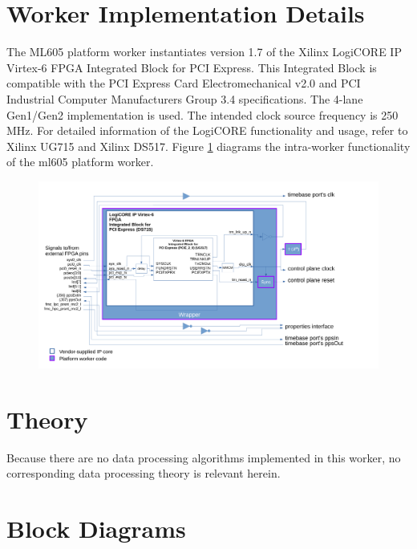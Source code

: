 \documentclass{article}
\begin{document}
\section*{Worker Implementation Details}
\begin{flushleft}
	The ML605 platform worker instantiates version 1.7 of the Xilinx LogiCORE IP Virtex-6 FPGA Integrated Block for PCI Express. This Integrated Block is compatible with the PCI Express Card Electromechanical v2.0 and PCI Industrial Computer Manufacturers Group 3.4 specifications. The 4-lane Gen1/Gen2 implementation is used. The intended clock source frequency is 250 MHz. For detailed information of the LogiCORE functionality and usage, refer to Xilinx UG715 and Xilinx DS517. Figure \ref{fig:blockdiagram} diagrams the intra-worker functionality of the ml605 platform worker.\medskip

	\begin{figure}[h]
		\centering\captionsetup{type=figure}\includegraphics[scale=0.5]{ml605_platform_worker_block_diagram}
		\label{fig:blockdiagram}
	\end{figure}
\end{flushleft}
\pagebreak

\section*{Theory}
Because there are no data processing algorithms implemented in this worker, no corresponding data processing theory is relevant herein.

\section*{Block Diagrams}
\end{document}
